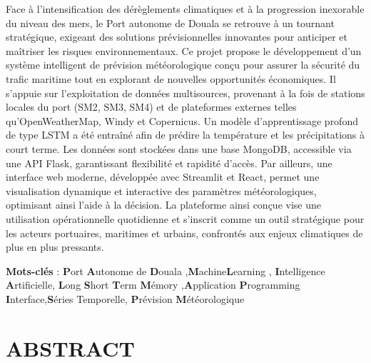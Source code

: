 \documentclass[a4paper,12pt,openany]{report}
\begin{document}
	\quad Face à l’intensification des dérèglements climatiques et à la progression inexorable du niveau des mers, le Port autonome de Douala se retrouve à un tournant stratégique, exigeant des solutions prévisionnelles innovantes pour anticiper et maîtriser les risques environnementaux.
	Ce projet propose le développement d’un système intelligent de prévision météorologique conçu pour assurer la sécurité du trafic maritime tout en explorant de nouvelles opportunités économiques. Il s’appuie sur l’exploitation de données multisources, provenant à la fois de stations locales du port (SM2, SM3, SM4) et de plateformes externes telles qu’OpenWeatherMap, Windy et Copernicus.
	Un modèle d’apprentissage profond de type LSTM a été entraîné afin de prédire la température et les précipitations à court terme. Les données sont stockées dans une base MongoDB, accessible via une API Flask, garantissant flexibilité et rapidité d’accès. Par ailleurs, une interface web moderne, développée avec Streamlit et React, permet une visualisation dynamique et interactive des paramètres météorologiques, optimisant ainsi l’aide à la décision.
	La plateforme ainsi conçue vise une utilisation opérationnelle quotidienne et s’inscrit comme un outil stratégique pour les acteurs portuaires, maritimes et urbains, confrontés aux enjeux climatiques de plus en plus pressants.
	
	
	
	
	
	\textbf{Mots-clés }: \textbf{P}ort   \textbf{A}utonome de  \textbf{D}ouala ,\textbf{M}achine\textbf{L}earning , \textbf{I}ntelligence  \textbf {A}rtificielle, \textbf{L}ong \textbf{S}hort \textbf{T}erm \textbf{M}émory ,\textbf{A}pplication  \textbf{P}rogramming \textbf{I}nterface,\textbf{S}éries {T}emporelle, \textbf {P}révision    \textbf{M}étéorologique    



\chapter*{ABSTRACT} %
	\label{ch:abstract}
	\label{ch:resume}
	
\end{document}
